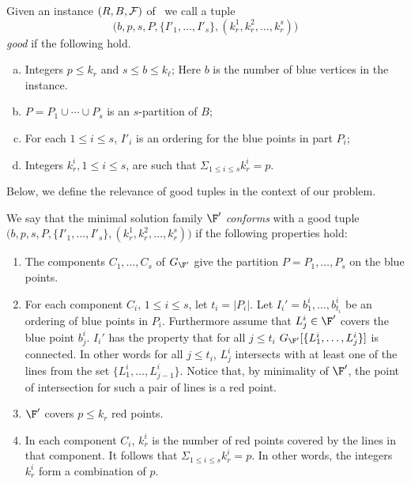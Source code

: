 \begin{definition} \label{goodtuple}Given an instance $(R,B,{\cal F})$ of \slrbsc\, we call a tuple 
$$\Big(b,p,s, P,   \{I'_1,\ldots,I'_s\}, (k_r^1,k_r^2,\ldots, k_r^s)\Big)$$  {\em good} if the following hold. 
\begin{enumerate}[(a)] 
 \item Integers $p\leq k_r$  and $s\leq b \leq k_\ell$; Here $b$ is the number of blue vertices in the instance.
 \item $P=P_1 \cup \cdots \cup  P_s$ is an $s$-partition of $B$;
 \item For each $1 \leq i \leq s$, $I'_i$ is an ordering for the blue points in part $P_i$;
 \item Integers $k_r^i,1 \leq i \leq s$, are such that $\Sigma_{1 \leq i \leq s} k_r^i = p$. 
\end{enumerate}
\end{definition}


Below, we define the relevance of good tuples in the context of our problem.
\begin{definition}\label{conforming_tuple}
 We say that the minimal solution family $\F'$ {\em conforms} with a good tuple $\Big(b,p,s, P,   \{I'_1,\ldots,I'_s\}, (k_r^1,k_r^2,\ldots, k_r^s)\Big)$
if the following properties hold:
 \begin{enumerate}
\item The components $C_1,\ldots, C_s$ of $G_{\F'}$ give the partition $P = P_1,\ldots, P_s$ on the blue points.
    \item For each component $C_i$, $1 \leq i \leq s$, let $t_i= \vert P_i \vert$. Let $I_i'=b_1^i,\ldots,b_{t_i}^i$  be an ordering of blue points in $P_i$. Furthermore assume that $L^i_j \in \F'$ covers the blue point $b_j^i$. $I_i'$ has the property that for all $j\leq t_i$ $G_{\F'}[\{L_1^i,\ldots,L_{j}^i \} ]$ is connected. In other words for all $j\leq t_i$, $L_{j}^i$ intersects with at least one of the lines from the set $\{L_1^i,\ldots,L_{j-1}^i \}$.  Notice that, by minimality of  
     $\F'$, the point of intersection for such a pair of lines is a red point.  
    
\item $\F'$ covers $p \leq k_r$ red points.
  \item In each component $C_i$, $k_r^i$ is the number of red points covered by the lines in that component. It follows that $\Sigma_{1 \leq i \leq s} k_r^i =p$. In other words, the integers $k_r^i$ form a combination of $p$.
 \end{enumerate}
\end{definition}


